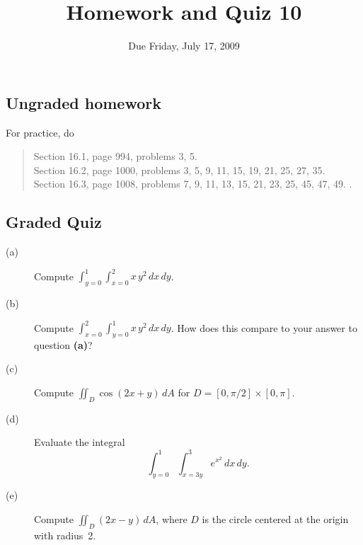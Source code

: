 \documentclass[11pt]{article}
\title{Homework and Quiz 10}
\date{Due Friday, July 17, 2009}
\begin{document}
\maketitle

\subsection*{Ungraded homework}

For practice, do
\begin{quote}
  Section 16.1, page 994, problems 3, 5.\\
  Section 16.2, page 1000, problems 3, 5, 9, 11, 15, 19, 21, 25, 27, 35.\\
  Section 16.3, page 1008, problems 7, 9, 11, 13, 15, 21, 23, 25, 45, 47, 49. .\\
\end{quote}
\vfill

\subsection*{Graded Quiz}

\begin{description}
\item[(a)] Compute $\displaystyle\int_{y = 0}^1\displaystyle\int_{x = 0}^2 x\,y^2\,dx\,dy$.
\vfill
\item[(b)] Compute $\displaystyle\int_{x = 0}^2\displaystyle\int_{y = 0}^1 x\,y^2\,dx\,dy$.  How does this compare to your answer to question \textbf{(a)}?
\vfill
\item[(c)] Compute $\displaystyle\iint_D \cos \left( 2 x + y \right) \, dA$ for $D = [0,\pi/2] \times [0,\pi]$.
\vfill
\item[(d)] Evaluate the integral
$$
\int_{y = 0}^1 \int_{x = 3y}^3 e^{x^2}\,dx\,dy.
$$
\vfill
\item[(e)] Compute $\displaystyle\iint_D \left( 2x - y \right) \,dA$, where $D$ is the circle centered at the origin with radius~2.
\vfill
\end{description}
\end{document}
